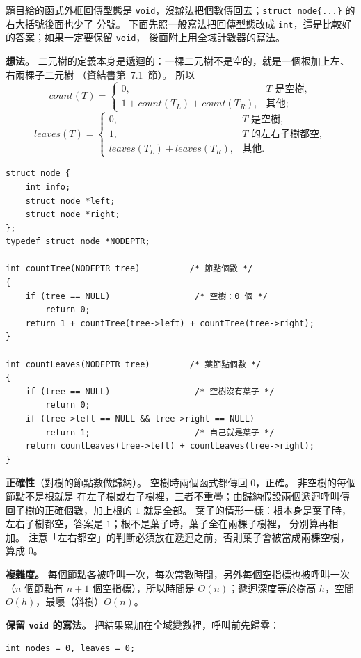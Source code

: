 \begin{pastsoln}
題目給的函式外框回傳型態是 \texttt{void}，沒辦法把個數傳回去；\texttt{struct node\{...\}} 的右大括號後面也少了
分號。 下面先照一般寫法把回傳型態改成 \texttt{int}，這是比較好的答案；如果一定要保留 \texttt{void}，
後面附上用全域計數器的寫法。

\textbf{想法。} 二元樹的定義本身是遞迴的：一棵二元樹不是空的，就是一個根加上左、右兩棵子二元樹
（資結書第~7.1~節）。 所以
\[
\mathit{count}(T) = \begin{cases} 0, & T \text{ 是空樹}, \\
1 + \mathit{count}(T_L) + \mathit{count}(T_R), & \text{其他}; \end{cases}
\]
\[
\mathit{leaves}(T) = \begin{cases} 0, & T \text{ 是空樹}, \\
1, & T \text{ 的左右子樹都空}, \\
\mathit{leaves}(T_L) + \mathit{leaves}(T_R), & \text{其他}. \end{cases}
\]
\begin{verbatim}
struct node {
    int info;
    struct node *left;
    struct node *right;
};
typedef struct node *NODEPTR;

int countTree(NODEPTR tree)          /* 節點個數 */
{
    if (tree == NULL)                 /* 空樹：0 個 */
        return 0;
    return 1 + countTree(tree->left) + countTree(tree->right);
}

int countLeaves(NODEPTR tree)        /* 葉節點個數 */
{
    if (tree == NULL)                 /* 空樹沒有葉子 */
        return 0;
    if (tree->left == NULL && tree->right == NULL)
        return 1;                     /* 自己就是葉子 */
    return countLeaves(tree->left) + countLeaves(tree->right);
}
\end{verbatim}

\textbf{正確性}（對樹的節點數做歸納）。 空樹時兩個函式都傳回 $0$，正確。 非空樹的每個節點不是根就是
在左子樹或右子樹裡，三者不重疊；由歸納假設兩個遞迴呼叫傳回子樹的正確個數，加上根的 $1$ 就是全部。
葉子的情形一樣：根本身是葉子時，左右子樹都空，答案是 $1$；根不是葉子時，葉子全在兩棵子樹裡，
分別算再相加。 注意「左右都空」的判斷必須放在遞迴之前，否則葉子會被當成兩棵空樹，算成 $0$。

\textbf{複雜度。} 每個節點各被呼叫一次，每次常數時間，另外每個空指標也被呼叫一次（$n$ 個節點有
$n + 1$ 個空指標），所以時間是 $O(n)$；遞迴深度等於樹高 $h$，空間 $O(h)$，最壞（斜樹）$O(n)$。

\textbf{保留 \texttt{void} 的寫法。} 把結果累加在全域變數裡，呼叫前先歸零：
\begin{verbatim}
int nodes = 0, leaves = 0;


\end{verbatim}
\end{pastsoln}
